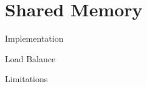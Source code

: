 \section{Shared Memory}


\begin{frame}
	\begin{block}{Implementation}
	\end{block}
	\begin{block}{Load Balance}
	\end{block}
	\begin{block}{Limitations}
	\end{block}
\end{frame}